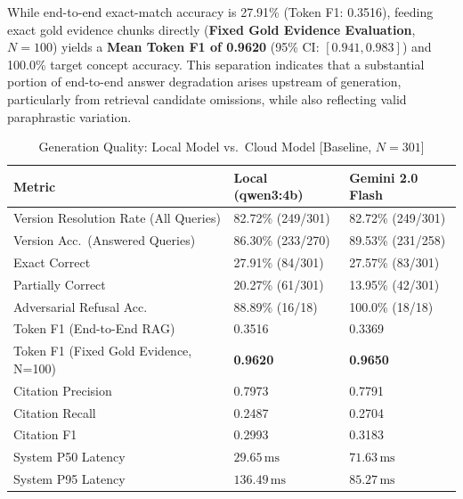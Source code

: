 \documentclass[journal]{IEEEtran}
\newcommand{\ms}{\,\mathrm{ms}}
\begin{document}
While end-to-end exact-match accuracy is 27.91\% (Token F1: 0.3516), feeding exact gold evidence chunks directly (\textbf{Fixed Gold Evidence Evaluation}, $N=100$) yields a \textbf{Mean Token F1 of 0.9620} (95\% CI: $[0.941, 0.983]$) and 100.0\% target concept accuracy. This separation indicates that a substantial portion of end-to-end answer degradation arises upstream of generation, particularly from retrieval candidate omissions, while also reflecting valid paraphrastic variation.

\begin{table}[!t]
\caption{Generation Quality: Local Model vs.\ Cloud Model [Baseline, $N=301$]}
\label{tab:generation}
\centering
\scriptsize
\setlength{\tabcolsep}{2.0pt}
\renewcommand{\arraystretch}{0.85}
\begin{tabularx}{\columnwidth}{ZYY}
\toprule
\textbf{Metric} & \textbf{Local (qwen3:4b)} & \textbf{Gemini 2.0 Flash}\\
\midrule
Version Resolution Rate (All Queries) & 82.72\% (249/301) & 82.72\% (249/301)\\
Version Acc.\ (Answered Queries) & 86.30\% (233/270) & 89.53\% (231/258)\\
Exact Correct & 27.91\% (84/301) & 27.57\% (83/301)\\
Partially Correct & 20.27\% (61/301) & 13.95\% (42/301)\\
Adversarial Refusal Acc. & 88.89\% (16/18) & 100.0\% (18/18)\\
Token F1 (End-to-End RAG) & 0.3516 & 0.3369\\
Token F1 (Fixed Gold Evidence, N=100) & \textbf{0.9620} & \textbf{0.9650}\\
Citation Precision & 0.7973 & 0.7791\\
Citation Recall & 0.2487 & 0.2704\\
Citation F1 & 0.2993 & 0.3183\\
System P50 Latency & $29.65\ms$ & $71.63\ms$\\
System P95 Latency & $136.49\ms$ & $85.27\ms$\\
\bottomrule
\end{tabularx}
\end{table}
\end{document}

